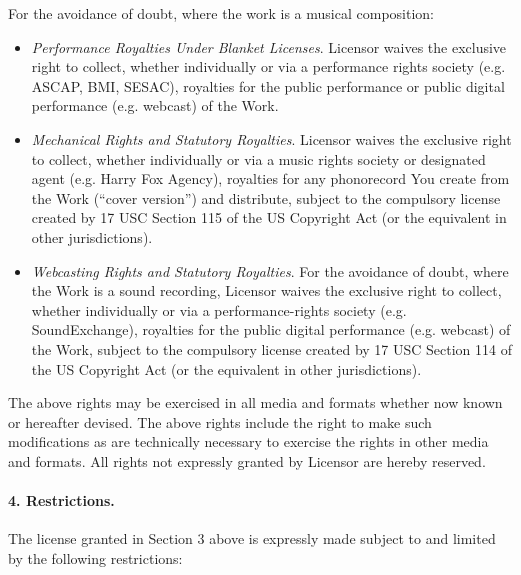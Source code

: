 For the avoidance of doubt, where the work is a musical composition:
\begin{itemize}
\item[] \emph{Performance Royalties Under Blanket Licenses}. Licensor waives the exclusive right to collect, whether individually or via a performance rights society (e.g. ASCAP, BMI, SESAC), royalties for the public performance or public digital performance (e.g. webcast) of the Work.
\item[] \emph{Mechanical Rights and Statutory Royalties}. Licensor waives the exclusive right to collect, whether individually or via a music rights society or designated agent (e.g. Harry Fox Agency), royalties for any phonorecord You create from the Work (``cover version'') and distribute, subject to the compulsory license created by 17 USC Section 115 of the US Copyright Act (or the equivalent in other jurisdictions).
\item[] \emph{Webcasting Rights and Statutory Royalties}. For the avoidance of doubt, where the Work is a sound recording, Licensor waives the exclusive right to collect, whether individually or via a performance-rights society (e.g. SoundExchange), royalties for the public digital performance (e.g. webcast) of the Work, subject to the compulsory license created by 17 USC Section 114 of the US Copyright Act (or the equivalent in other jurisdictions).
\end{itemize}

The above rights may be exercised in all media and formats whether now known or hereafter devised. The above rights include the right to make such modifications as are technically necessary to exercise the rights in other media and formats. All rights not expressly granted by Licensor are hereby reserved.

\paragraph{4. Restrictions.} The license granted in Section 3 above is expressly made subject to and limited by the following restrictions:

